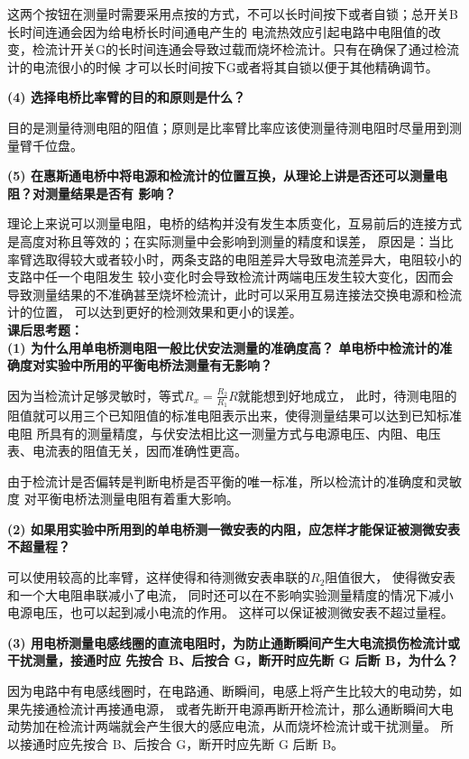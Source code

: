 \documentclass[UTF8]{ctexart}
\begin{document}
这两个按钮在测量时需要采用点按的方式，不可以长时间按下或者自锁；总开关B长时间连通会因为给电桥长时间通电产生的
电流热效应引起电路中电阻值的改变，检流计开关G的长时间连通会导致过载而烧坏检流计。只有在确保了通过检流计的电流很小的时候
才可以长时间按下G或者将其自锁以便于其他精确调节。

\noindent  \textbf{(4) 选择电桥比率臂的目的和原则是什么？}

目的是测量待测电阻的阻值；原则是比率臂比率应该使测量待测电阻时尽量用到测量臂千位盘。

\noindent  \textbf{(5) 在惠斯通电桥中将电源和检流计的位置互换，从理论上讲是否还可以测量电阻？对测量结果是否有
影响？}

理论上来说可以测量电阻，电桥的结构并没有发生本质变化，互易前后的连接方式是高度对称且等效的；在实际测量中会影响到测量的精度和误差，
原因是：当比率臂选取得较大或者较小时，两条支路的电阻差异大导致电流差异大，电阻较小的支路中任一个电阻发生
较小变化时会导致检流计两端电压发生较大变化，因而会导致测量结果的不准确甚至烧坏检流计，此时可以采用互易连接法交换电源和检流计的位置，
可以达到更好的检测效果和更小的误差。\\


\noindent  \textbf{课后思考题：}\\

\noindent  \textbf{(1) 为什么用单电桥测电阻一般比伏安法测量的准确度高？
单电桥中检流计的准确度对实验中所用的平衡电桥法测量有无影响？}

因为当检流计足够灵敏时，等式$R_x=\frac{R_2}{R_1} R$就能想到好地成立，
此时，待测电阻的阻值就可以用三个已知阻值的标准电阻表示出来，使得测量结果可以达到已知标准电阻
所具有的测量精度，与伏安法相比这一测量方式与电源电压、内阻、电压表、电流表的阻值无关，因而准确性更高。

由于检流计是否偏转是判断电桥是否平衡的唯一标准，所以检流计的准确度和灵敏度
对平衡电桥法测量电阻有着重大影响。



\noindent  \textbf{(2) 如果用实验中所用到的单电桥测一微安表的内阻，应怎样才能保证被测微安表不超量程？}

可以使用较高的比率臂，这样使得和待测微安表串联的$R_2$阻值很大，
使得微安表和一个大电阻串联减小了电流，
同时还可以在不影响实验测量精度的情况下减小电源电压，也可以起到减小电流的作用。
这样可以保证被测微安表不超过量程。


\noindent  \textbf{(3) 用电桥测量电感线圈的直流电阻时，为防止通断瞬间产生大电流损伤检流计或干扰测量，接通时应
先按合 B、后按合 G，断开时应先断 G 后断 B，为什么？}

因为电路中有电感线圈时，在电路通、断瞬间，电感上将产生比较大的电动势，如果先接通检流计再接通电源，
或者先断开电源再断开检流计，那么通断瞬间大电动势加在检流计两端就会产生很大的感应电流，从而烧坏检流计或干扰测量。
所以接通时应先按合 B、后按合 G，断开时应先断 G 后断 B。
\end{document}
